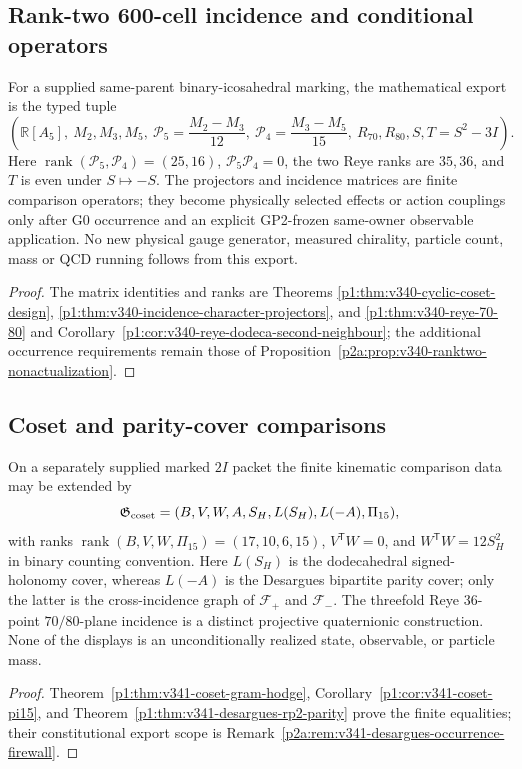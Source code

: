 \documentclass[12pt,a4paper]{article}
\begin{document}
\subsection{Rank-two 600-cell incidence and conditional operators}
\label{p2e:sec:v340-ranktwo-export}
\begin{corollary}
\label{p2e:cor:v340-ranktwo-export-contract}
For a supplied same-parent binary-icosahedral marking, the
mathematical export is the typed tuple
\[
\left(\mathbb R[A_5],\ M_2,M_3,M_5,\
 \mathscr P_5=\frac{M_2-M_3}{12},\
 \mathscr P_4=\frac{M_3-M_5}{15},\
 R_{70},R_{80},S,T=S^2-3I\right).
\]
Here $\operatorname{rank}(\mathscr P_5,\mathscr P_4)=(25,16)$,
$\mathscr P_5\mathscr P_4=0$, the two Reye ranks are $35,36$,
and $T$ is even under $S\mapsto-S$. The projectors and incidence
matrices are finite comparison operators; they become physically
selected effects or action couplings only after G0 occurrence and an
explicit GP2-frozen same-owner observable application. No new
physical gauge generator, measured chirality, particle count, mass
or QCD running follows from this export.
\end{corollary}
\begin{proof}
The matrix identities and ranks are Theorems
\ref{p1:thm:v340-cyclic-coset-design},
\ref{p1:thm:v340-incidence-character-projectors},
and \ref{p1:thm:v340-reye-70-80} and
Corollary~\ref{p1:cor:v340-reye-dodeca-second-neighbour}; the
additional occurrence requirements remain those of
Proposition~\ref{p2a:prop:v340-ranktwo-nonactualization}.
\end{proof}


\subsection{Coset and parity-cover comparisons}
\begin{corollary}[Typed 25-cell Gram and parity-cover export]
\label{p2e:cor:v341-coset-desargues-export}
On a separately supplied marked $2I$ packet the finite kinematic
comparison data may be extended by
\[
 \mathfrak G_{\rm coset}=(B,V,W,A,S_H,L(S_H),L(-A),\Pi_{15}),
\]
with ranks
$\operatorname{rank}(B,V,W,\Pi_{15})=(17,10,6,15)$,
$V^{\mathsf T}W=0$, and
$W^{\mathsf T}W=12S_H^2$ in binary counting convention.
Here $L(S_H)$ is the dodecahedral signed-holonomy cover,
whereas $L(-A)$ is the Desargues bipartite parity cover;
only the latter is the cross-incidence graph of
$\mathcal F_+$ and $\mathcal F_-$.  The threefold Reye
$36$-point $70/80$-plane incidence is a distinct projective
quaternionic construction.  None of the displays is an
unconditionally realized state, observable, or particle mass.
\end{corollary}
\begin{proof}
Theorem~\ref{p1:thm:v341-coset-gram-hodge},
Corollary~\ref{p1:cor:v341-coset-pi15}, and
Theorem~\ref{p1:thm:v341-desargues-rp2-parity} prove the
finite equalities; their constitutional export scope is
Remark~\ref{p2a:rem:v341-desargues-occurrence-firewall}.
\end{proof}
\end{document}
